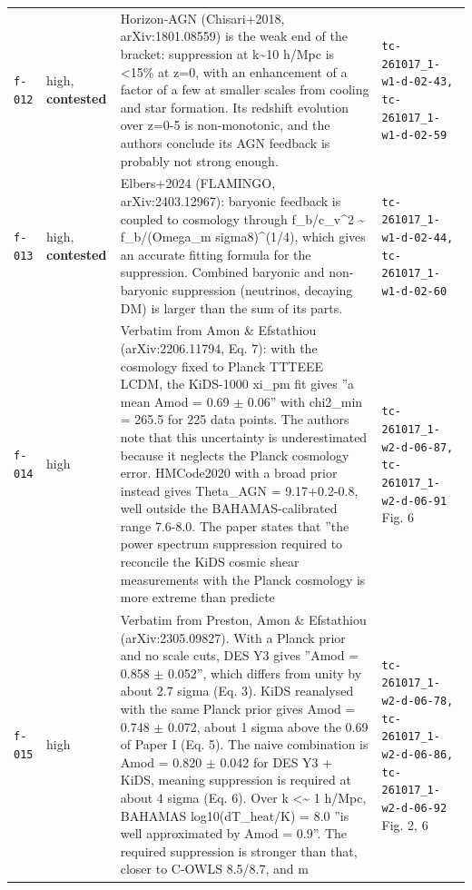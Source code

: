 \documentclass[11pt,a4paper]{article}
\begin{document}
\begin{longtable}{@{}p{}p{}p{}p{}@{}}
\texttt{f-012} & high, \textbf{contested} & Horizon-AGN (Chisari+2018, arXiv:1801.08559) is the weak end of the bracket: suppression at k\textasciitilde{}10 h/Mpc is \textless{}15\% at z=0, with an enhancement of a factor of a few at smaller scales from cooling and star formation. Its redshift evolution over z=0-5 is non-monotonic, and the authors conclude its AGN feedback is probably not strong enough. & \texttt{tc-261017\_\allowbreak{}1-w1-d-02-43,\allowbreak{} tc-261017\_\allowbreak{}1-w1-d-02-59} \\
\texttt{f-013} & high, \textbf{contested} & Elbers+2024 (FLAMINGO, arXiv:2403.12967): baryonic feedback is coupled to cosmology through f\_b/c\_v\textasciicircum{}2 \textasciitilde{} f\_b/(Omega\_m sigma8)\textasciicircum{}(1/4), which gives an accurate fitting formula for the suppression. Combined baryonic and non-baryonic suppression (neutrinos, decaying DM) is larger than the sum of its parts. & \texttt{tc-261017\_\allowbreak{}1-w1-d-02-44,\allowbreak{} tc-261017\_\allowbreak{}1-w1-d-02-60} \\
\texttt{f-014} & high & Verbatim from Amon \& Efstathiou (arXiv:2206.11794, Eq. 7): with the cosmology fixed to Planck TTTEEE LCDM, the KiDS-1000 xi\_pm fit gives ''a mean Amod = 0.69 $\pm$ 0.06'' with chi2\_min = 265.5 for 225 data points. The authors note that this uncertainty is underestimated because it neglects the Planck cosmology error. HMCode2020 with a broad prior instead gives Theta\_AGN = 9.17+0.2-0.8, well outside the BAHAMAS-calibrated range 7.6-8.0. The paper states that ''the power spectrum suppression required to reconcile the KiDS cosmic shear measurements with the Planck cosmology is more extreme than predicte & \texttt{tc-261017\_\allowbreak{}1-w2-d-06-87,\allowbreak{} tc-261017\_\allowbreak{}1-w2-d-06-91} Fig. 6 \\
\texttt{f-015} & high & Verbatim from Preston, Amon \& Efstathiou (arXiv:2305.09827). With a Planck prior and no scale cuts, DES Y3 gives ''Amod = 0.858 $\pm$ 0.052'', which differs from unity by about 2.7 sigma (Eq. 3). KiDS reanalysed with the same Planck prior gives Amod = 0.748 $\pm$ 0.072, about 1 sigma above the 0.69 of Paper I (Eq. 5). The naive combination is Amod = 0.820 $\pm$ 0.042 for DES Y3 + KiDS, meaning suppression is required at about 4 sigma (Eq. 6). Over k \textless{}\textasciitilde{} 1 h/Mpc, BAHAMAS log10(dT\_heat/K) = 8.0 ''is well approximated by Amod = 0.9''. The required suppression is stronger than that, closer to C-OWLS 8.5/8.7, and m & \texttt{tc-261017\_\allowbreak{}1-w2-d-06-78,\allowbreak{} tc-261017\_\allowbreak{}1-w2-d-06-86,\allowbreak{} tc-261017\_\allowbreak{}1-w2-d-06-92} Fig. 2, 6 \\

\end{longtable}
\end{document}
